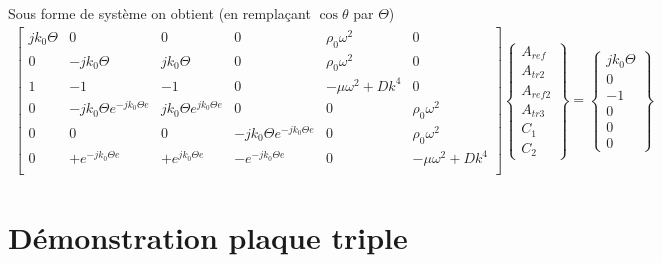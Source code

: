 \documentclass[12pt,foolscap]{report}
\begin{document}
	Sous forme de système on obtient (en remplaçant $\cos \theta$ par $\Theta$)
	\begin{align}	
	\begin{bmatrix}
	j k_0 \Theta    &0 & 0 &0&\rho_0\omega^2&0  \\
	0       & -j k_0 \Theta & j k_0 \Theta & 0 &\rho_0\omega^2 & 0  \\
	1       & -1 & -1 & 0 &-\mu \omega^2+Dk^4 & 0  \\
	0    &-j k_0 \Theta e^{-jk_0\Theta e}   & j k_0 \Theta e^{jk_0\Theta e}   &0&0&\rho_0\omega^2  \\
	0       & 0 & 0 &- j k_0 \Theta e^{-jk_0\Theta e} &0 & \rho_0\omega^2   \\
	0     & + e^{-jk_0\Theta e} & +e^{jk_0\Theta e} & - 	e^{-jk_0\Theta e} &0 & -\mu \omega^2+Dk^4  \\
	\end{bmatrix}
	\begin{Bmatrix}
	A_{ref} \\
	A_{tr2} \\
	A_{ref2}\\
	A_{tr3}\\
	C_{1} \\
	C_{2} 
	\end{Bmatrix}
	=\begin{Bmatrix}
	j k_0 \Theta \\
	0 \\
	-1\\
	0\\
	0 \\
	0
	\end{Bmatrix}
	\end{align}
	
	
	
	\chapter{Démonstration plaque triple}
	\label{ch:demotriple}
\end{document}
